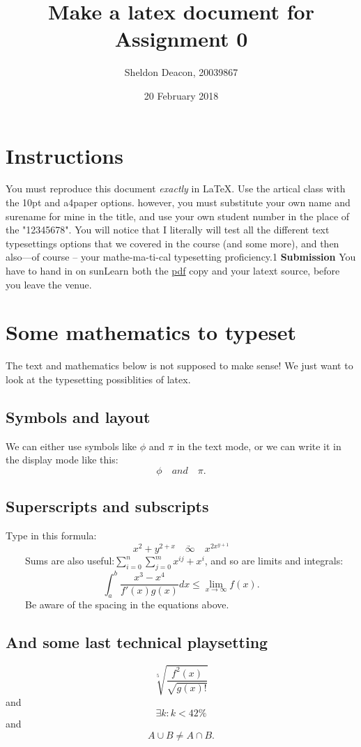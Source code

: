 \documentclass[10pt]{article} %
\author{Sheldon Deacon, 20039867}
\title{Make a latex document for Assignment 0}
\date{20 February 2018}
\begin{document}
\maketitle

\section{Instructions} %

You must reproduce this document \textit{exactly} in LaTeX. Use the artical class with
the 10pt and a4paper options. however, you must substitute your own name and
surename for mine in the title, and use your own student number in the place of
the "12345678". You will notice that I literally will test all the different
text typesettings options that we covered in the course (and some more), and
then also---of course -- your mathe-ma-ti-cal typesetting proficiency.1
\textbf{Submission} You have to hand in on sunLearn both the \underline{pdf} copy and your latext
source, before you leave the venue.

\section{Some mathematics to typeset}
The text and mathematics below is not supposed to make sense! We just want to
look at the typesetting possiblities of latex.


\subsection{Symbols and layout}
We can either use symbols like $\phi$ and $\pi$ in the text mode, or we can write it in
the display mode like this:
\begin{equation*}
	\phi \quad and \quad \pi.
\end{equation*}
 
\subsection{Superscripts and subscripts}
Type in this formula:
\begin{equation*}
	x^{2} + y^{2+x} \quad \underrightarrow{\infty} \quad x^{2x^{y+1}}
\end{equation*}
$\qquad$Sums are also useful:$\sum_{i=0}^n \sum_{j=0}^m x^{ij} + x^{i}$, and so are
limits and integrals:
\begin{equation*}
	\int_a^{b} \frac{x^{3} - x^{4}}{f'(x)g(x)} dx \leq \lim_{x \rightarrow
	\infty} f(x).
\end{equation*}
$\qquad$Be aware of the spacing in the equations above.

\subsection{And some last technical playsetting}

\begin{equation*}
	\sqrt[5]{\frac{f^{2}(x)}{\sqrt{g(x)!}}}
\end{equation*}
and
\begin{equation*}
	\exists k : k < 42\% 
\end{equation*}
and
\begin{equation*}
	A \cup B \neq A \cap B.
\end{equation*}
\end{document}
